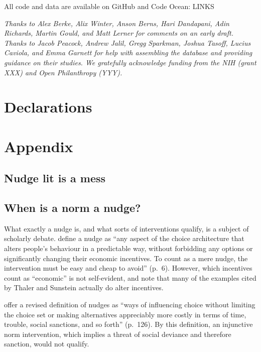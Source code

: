 \documentclass[sn-nature,pdflatex]{sn-jnl}
\begin{document}
\backmatter


All code and data are available on GitHub and Code Ocean: LINKS


\emph{Thanks to Alex Berke, Alix Winter, Anson Berns, Hari Dandapani,
Adin Richards, Martin Gould, and Matt Lerner for comments on an early
draft. Thanks to Jacob Peacock, Andrew Jalil, Gregg Sparkman, Joshua
Tasoff, Lucius Caviola, and Emma Garnett for help with assembling the
database and providing guidance on their studies. We gratefully
acknowledge funding from the NIH (grant XXX) and Open Philanthropy
(YYY).}

\section*{Declarations}\label{declarations}

\section{Appendix}\label{secA1}

\subsection{Nudge lit is a mess}\label{nudge-lit-is-a-mess}

\subsection{When is a norm a nudge?}\label{when-is-a-norm-a-nudge}

What exactly a nudge is, and what sorts of interventions qualify, is a
subject of scholarly debate. \citep{thaler2009} define a nudge as ``any
aspect of the choice architecture that alters people's behaviour in a
predictable way, without forbidding any options or significantly
changing their economic incentives. To count as a mere nudge, the
intervention must be easy and cheap to avoid'' (p.~6). However, which
incentives count as ``economic'' is not self-evident, and
\citep{selinger2012} note that many of the examples cited by Thaler and
Sunstein actually do alter incentives.

\citep{hausman2010} offer a revised definition of nudges as ``ways of
influencing choice without limiting the choice set or making
alternatives appreciably more costly in terms of time, trouble, social
sanctions, and so forth'' (p.~126). By this definition, an injunctive
norm intervention, which implies a threat of social deviance and
therefore sanction, would not qualify.
\end{document}
